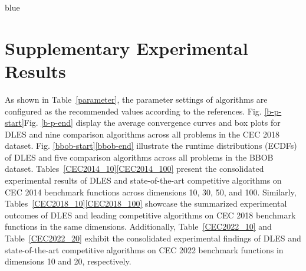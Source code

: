 \documentclass[journal, onecolumn]{IEEEtran}
\begin{document}
\begin{color}{blue}
\section{Supplementary Experimental Results}\label{a-r}
As shown in Table~\ref{parameter}, the parameter settings of algorithms are configured as the recommended values according to the references. Fig. \ref{b-p-start}\textemdash Fig. \ref{b-p-end} display the average convergence curves and box plots for DLES and nine comparison algorithms across all problems in the CEC 2018 dataset. Fig. \ref{bbob-start}\textemdash \ref{bbob-end} illustrate the runtime distributions (ECDFs) of DLES and five comparison algorithms across all problems in the BBOB dataset. Tables~\ref{CEC2014_10}\textemdash \ref{CEC2014_100} present the consolidated experimental results of DLES and state-of-the-art competitive algorithms on CEC 2014 benchmark functions across dimensions 10, 30, 50, and 100. Similarly, Tables~\ref{CEC2018_10}\textemdash \ref{CEC2018_100} showcase the summarized experimental outcomes of DLES and leading competitive algorithms on CEC 2018 benchmark functions in the same dimensions. Additionally, Table~\ref{CEC2022_10} and Table~\ref{CEC2022_20} exhibit the consolidated experimental findings of DLES and state-of-the-art competitive algorithms on CEC 2022 benchmark functions in dimensions 10 and 20, respectively.


\end{color}
\end{document}
